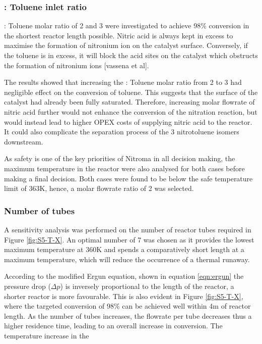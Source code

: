 \subsubsection{ : Toluene inlet ratio}

 : Toluene molar ratio of 2 and 3 were investigated to achieve 98\% conversion in the shortest reactor length possible. Nitric acid is always kept in excess to maximise the formation of nitronium ion on the catalyst surface. Conversely, if the toluene is in excess, it will block the acid sites on the catalyst which obstructs the formation of nitronium ions [vassena et al]. 

The results showed that increasing the  : Toluene molar ratio from 2 to 3 had negligible effect on the conversion of toluene. This suggests that the surface of the catalyst had already been fully saturated. Therefore, increasing molar flowrate of nitric acid further would not enhance the conversion of the nitration reaction, but would instead lead to higher OPEX costs of supplying nitric acid to the reactor. It could also complicate the separation process of the 3 nitrotoluene isomers downstream. 

As safety is one of the key priorities of Nitroma in all decision making, the maximum temperature in the reactor were also analysed for both cases before making a final decision. Both cases were found to be below the safe temperature limit of 363K, hence, a molar flowrate ratio of 2 was selected.

\subsubsection{Number of tubes}
A sensitivity analysis was performed on the number of reactor tubes required in Figure \ref{fig:S5-T-X}. An optimal number of 7 was chosen as it provides the lowest maximum temperature at 360K and spends a comparatively short length at a maximum temperature, which will reduce the occurrence of a thermal runaway.

According to the modified Ergun equation, shown in equation \ref{eqn:ergun} the pressure drop ($\Delta p$) is inversely proportional to the length of the reactor, a shorter reactor is more favourable.  This is also evident in Figure \ref{fig:S5-T-X}, where the targeted conversion of 98\% can be achieved well within 4m of reactor length. As the number of tubes increases, the flowrate per tube decreases thus a higher residence time, leading to an overall increase in conversion. The temperature increase in the 

